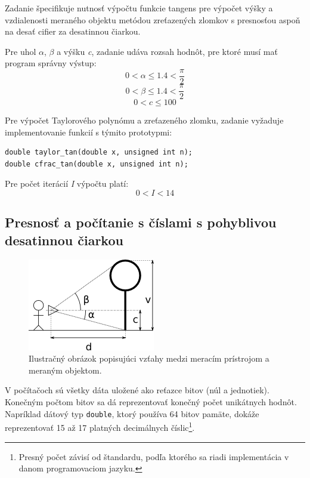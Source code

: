 \documentclass[12pt,a4paper,titlepage,final]{article}
\begin{document}
Zadanie špecifikuje nutnosť výpočtu funkcie tangens pre výpočet výšky a vzdialenosti meraného objektu metódou zreťazených zlomkov s presnosťou aspoň na desať cifier za desatinnou čiarkou.

Pre uhol $\alpha$, $\beta$ a výšku \textit{c}, zadanie udáva rozsah hodnôt, pre ktoré musí mať program správny výstup:
\begin{equation}\label{eq:limAlpha} 
0 < \alpha \leq 1.4 < \frac{\pi}{2}
\end{equation}
\begin{equation}\label{eq:limBeta} 
0 < \beta \leq 1.4 < \frac{\pi}{2}
\end{equation}
\begin{equation}\label{eq:limC} 
0 < c \leq 100
\end{equation}

Pre výpočet Taylorového polynómu a zreťazeného zlomku, zadanie vyžaduje implementovanie funkcií s týmito prototypmi:

\begin{verbatim}
double taylor_tan(double x, unsigned int n);
double cfrac_tan(double x, unsigned int n);
\end{verbatim}

Pre počet iterácií \textit{I} výpočtu platí:
\begin{equation}
0 < I < 14
\end{equation}


\subsection{Presnosť a počítanie s číslami s pohyblivou desatinnou čiarkou} \label{presnost}

\begin{figure}
  \centering
  \includegraphics[scale=1]{img/Diagram.png}
  \caption{Ilustračný obrázok popisujúci vzťahy medzi meracím prístrojom a meraným objektom.}
  \label{fig:obrazok1}
\end{figure}

V počítačoch sú všetky dáta uložené ako reťazce bitov (núl a jednotiek). Konečným počtom bitov sa dá reprezentovať konečný počet unikátnych hodnôt. Napríklad dátový typ  \texttt{double}, ktorý používa 64 bitov pamäte, dokáže reprezentovať 15 až 17 platných decimálnych číslic\footnote{\label{FNPresnost}Presný počet závisí od štandardu, podľa ktorého sa riadi implementácia v danom programovaciom jazyku.}.
\end{document}
